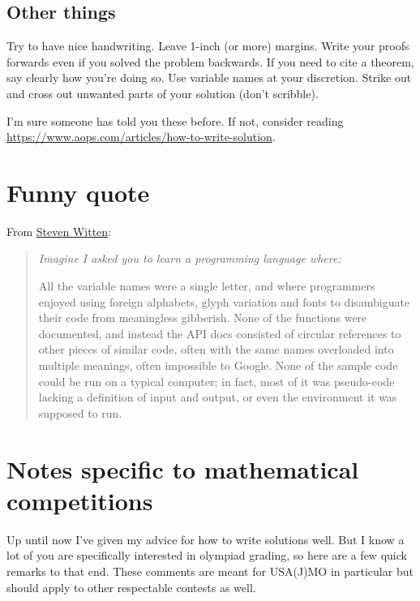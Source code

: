 \documentclass[11pt]{scrartcl}
\begin{document}
\subsection{Other things}
Try to have nice handwriting.
Leave 1-inch (or more) margins.
Write your proofs forwards even if you solved the problem backwards.
If you need to cite a theorem, say clearly how you're doing so.
Use variable names at your discretion.
Strike out and cross out unwanted parts of your solution (don't scribble).

I'm sure someone has told you these before.
If not, consider reading
\url{https://www.aops.com/articles/how-to-write-solution}.

\section{Funny quote}
From \href{https://www.gleech.org/better-maths}{Steven Witten}:
\begin{quote}
  \slshape
  Imagine I asked you to learn a programming language where:
  \begin{itemize}
  \ii All the variable names were a single letter,
  and where programmers enjoyed using foreign alphabets,
  glyph variation and fonts to disambiguate their code from meaningless gibberish.
  \ii None of the functions were documented,
  and instead the API docs consisted of circular references to other pieces of similar code,
  often with the same names overloaded into multiple meanings, often impossible to Google.
  \ii None of the sample code could be run on a typical computer;
  in fact, most of it was pseudo-code lacking a definition of input and output,
  or even the environment it was supposed to run.
  \end{itemize}
\end{quote}

\appendix

\section{Notes specific to mathematical competitions}
Up until now I've given my advice for how to write solutions well.
But I know a lot of you are specifically interested in olympiad grading,
so here are a few quick remarks to that end.
These comments are meant for USA(J)MO in particular
but should apply to other respectable contests as well.
\end{document}
